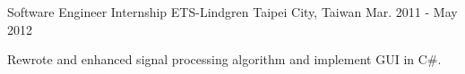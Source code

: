 \begin{cventries}
  \cventry
    {Software Engineer Internship} %
    {ETS-Lindgren} %
    {Taipei City, Taiwan} %
    {Mar. 2011 - May 2012} %
    {
      \begin{cvitems} %
        \item {Rewrote and enhanced signal processing algorithm and implement GUI in C\#.}
      \end{cvitems}
    }
\end{cventries}
